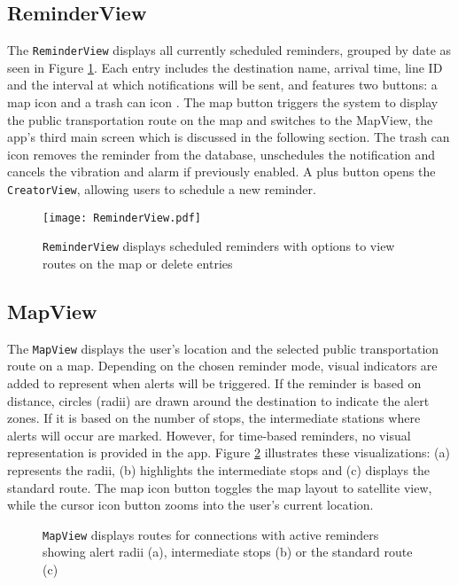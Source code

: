 \subsection{ReminderView}
The \lstinline{ReminderView} displays all currently scheduled reminders, grouped by date as seen in Figure \ref{fig:reminderview}. 
Each entry  includes the destination name, arrival time, line ID and the interval at which notifications will be sent, and features two buttons: a map icon  and a trash can icon . 
The map button triggers the system to display the public transportation route on the map and switches to the MapView, the app's third main screen which is discussed in the following section. 
The trash can icon removes the reminder from the database, unschedules the notification and cancels the vibration and alarm if previously enabled.
A plus button  opens the \lstinline{CreatorView}, allowing users to schedule a new reminder.

\begin{figure}[htbp]
    \centering
    \texttt{[image: ReminderView.pdf]}
    \caption{\lstinline{ReminderView} displays scheduled reminders with options to view routes on the map or delete entries}
    \label{fig:reminderview}
\end{figure}

\subsection{MapView}
The \lstinline{MapView} displays the user's location and the selected public transportation route on a map. 
Depending on the chosen reminder mode, visual indicators are added to represent when alerts will be triggered. 
If the reminder is based on distance, circles (radii)  are drawn around the destination to indicate the alert zones. 
If it is based on the number of stops, the intermediate stations  where alerts will occur are marked. 
However, for time-based reminders, no visual representation is provided in the app.
Figure \ref{fig:mapview} illustrates these visualizations: (a) represents the radii, (b) highlights the intermediate stops and (c) displays the standard route.
The map icon button  toggles the map layout to satellite view, while the cursor icon button  zooms into the user's current location.

\begin{figure}[htbp]%
    \centering
    \qquad
    \qquad
    \caption{\lstinline{MapView} displays routes for connections with active reminders showing alert radii (a), intermediate stops (b) or the standard route (c)}
    \label{fig:mapview}%
\end{figure}

